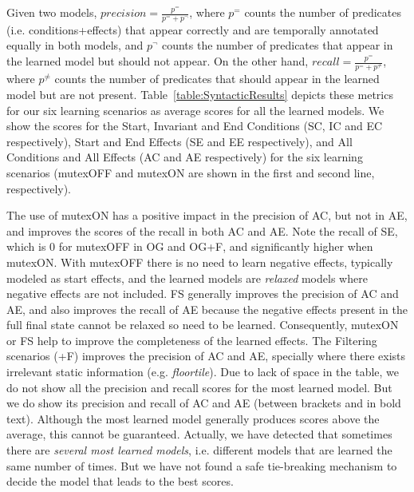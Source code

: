 \documentclass{ecai}
\begin{document}
Given two models, $precision=\frac{p^{=}}{p^{=} + p^{\neg}}$, where $p^{=}$ counts the number of predicates (i.e. conditions+effects) that appear correctly and are temporally annotated equally in both models, and $p^{\neg}$ counts the number of predicates that appear in the learned model but should not appear. On the other hand, $recall=\frac{p^{=}}{p^{=} + p^{\neq}}$, where $p^{\neq}$ counts the number of predicates that should appear in the learned model but are not present. Table~\ref{table:SyntacticResults} depicts these metrics for our six learning scenarios as average scores for all the learned models.
We show the scores for the Start, Invariant and End Conditions (SC, IC and EC respectively), Start and End Effects (SE and EE respectively), and All Conditions and All Effects (AC and AE respectively) for the six learning scenarios (mutexOFF and mutexON are shown in the first and second line, respectively).


The use of mutexON has a positive impact in the precision of AC, but not in AE, and improves the scores of the recall in both AC and AE. Note the recall of SE, which is 0 for mutexOFF in OG and OG+F, and significantly higher when mutexON. With mutexOFF there is no need to learn negative effects, typically modeled as start effects, and the learned models are \textit{relaxed} models where negative effects are not included.
FS generally improves the precision of AC and AE, and also improves the recall of AE because the negative effects present in the full final state cannot be relaxed so need to be learned. Consequently, mutexON or FS help to improve the completeness of the learned effects.
The Filtering scenarios (+F) improves the precision of AC and AE, specially where there exists irrelevant static information (e.g. \textit{floortile}).
Due to lack of space in the table, we do not show all the precision and recall scores for the most learned model. But we do show its precision and recall of AC and AE (between brackets and in bold text). Although the most learned model generally produces scores above the average, this cannot be guaranteed.
Actually, we have detected that sometimes there are \textit{several most learned models}, i.e. different models that are learned the same number of times. But we have not found a safe tie-breaking mechanism to decide 
the model that leads to the best scores. 
\end{document}
